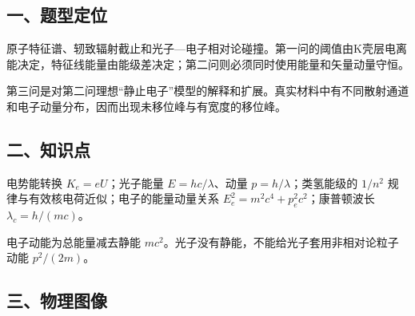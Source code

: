 \documentclass[12pt,a4paper,fontset=fandol]{ctexart}
\begin{document}
\begin{center}
\begin{minipage}{\linewidth}
\centering\begingroup{}
\ifdim\wd\diagrambox>.88\linewidth
\sbox{\diagrambox}{\resizebox{.88\linewidth}{!}{\usebox{\diagrambox}}}\fi
\ifdim\ht\diagrambox>.38\textheight
\resizebox{!}{.38\textheight}{\usebox{\diagrambox}}
\else\usebox{\diagrambox}\fi
\par{}\endgroup\end{minipage}\end{center}

\subsection{一、题型定位}\label{ux4e00ux9898ux578bux5b9aux4f4d-7}

原子特征谱、轫致辐射截止和光子---电子相对论碰撞。第一问的阈值由K壳层电离能决定，特征线能量由能级差决定；第二问则必须同时使用能量和矢量动量守恒。

第三问是对第二问理想``静止电子''模型的解释和扩展。真实材料中有不同散射通道和电子动量分布，因而出现未移位峰与有宽度的移位峰。

\subsection{二、知识点}\label{ux4e8cux77e5ux8bc6ux70b9-7}

电势能转换 \(K_e=eU\)；光子能量 \(E=hc/\lambda\)、动量
\(p=h/\lambda\)；类氢能级的 \(1/n^2\)
规律与有效核电荷近似；电子的能量动量关系
\(E_e^2=m^2c^4+p_e^2c^2\)；康普顿波长 \(\lambda_c=h/(mc)\)。

电子动能为总能量减去静能
\(mc^2\)。光子没有静能，不能给光子套用非相对论粒子动能 \(p^2/(2m)\)。

\subsection{三、物理图像}\label{ux4e09ux7269ux7406ux56feux50cf-7}
\end{document}
